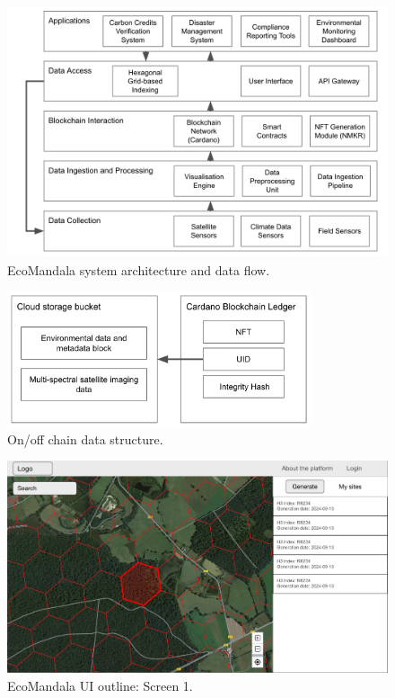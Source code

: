 \documentclass{scrreport}
\begin{document}
\begin{figure}[H]
\centering
\includegraphics[width=\textwidth]{Images/ecomandala-20240912-2.png}
\caption{EcoMandala system architecture and data flow.}
\label{fig:components_diagram}
\end{figure}

\begin{figure}[H]
    \centering
    \includegraphics[width=0.8\textwidth]{Images/ecomandala-data-20240913-2.png}
    \caption{On/off chain data structure.}
    \label{fig:data-structure}
\end{figure}

\begin{figure}[H]
\centering
\includegraphics[width=\textwidth]{Images/screen1-20240913-2.png}
\caption{EcoMandala UI outline: Screen 1.}
\label{fig:ui-screen-1}
\end{figure}
\end{document}
